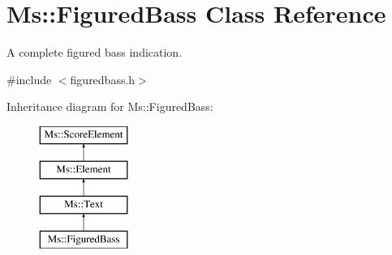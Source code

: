 \hypertarget{class_ms_1_1_figured_bass}{}\section{Ms\+:\+:Figured\+Bass Class Reference}
\label{class_ms_1_1_figured_bass}


A complete figured bass indication.  




{\ttfamily \#include $<$figuredbass.\+h$>$}

Inheritance diagram for Ms\+:\+:Figured\+Bass\+:\begin{figure}[H]
\begin{center}
\leavevmode
\includegraphics[height=4.000000cm]{class_ms_1_1_figured_bass}
\end{center}
\end{figure}
